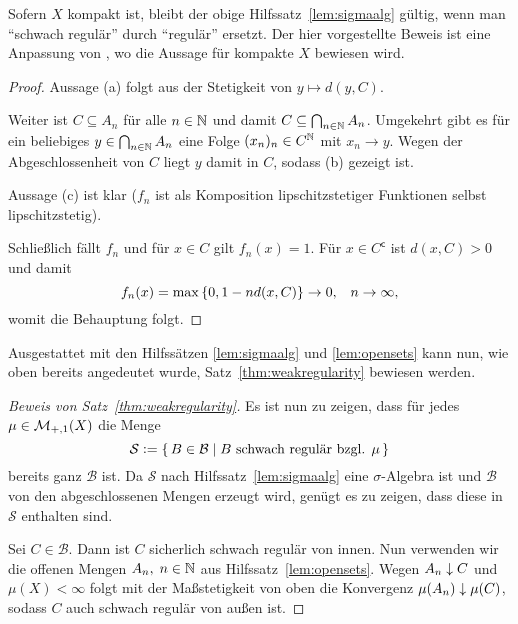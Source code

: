 \documentclass[../main/main.tex]{subfiles}
\begin{document}
	\begin{Bemerkung}
		Sofern $X$ kompakt ist, bleibt der obige Hilfssatz~\ref{lem:sigmaalg} 
		gültig, wenn man \enquote{schwach regulär} durch \enquote{regulär} 
		ersetzt. Der hier vorgestellte Beweis ist eine Anpassung von 
		\cite[Lemma 4.5.5]{Simon.2015}, wo die Aussage für kompakte $X$ bewiesen wird.
	\end{Bemerkung}

	\begin{proof}
		Aussage (a) folgt aus der Stetigkeit von $y \mapsto d(y, C)$.
		
		Weiter ist $C \subseteq A_n$ für alle $n \in \mathbb{N}$ und damit 
		$C \subseteq \bigcap_{n \in \mathbb{N}} A_n$. 
		Umgekehrt gibt es für ein beliebiges $y \in \bigcap_{n \in \mathbb{N}} A_n$
		eine Folge $(x_n)_n \in C^{\mathbb{N}}$ mit $x_n \rightarrow y$. 
		Wegen der Abgeschlossenheit von $C$ liegt $y$ damit in $C$, sodass (b) gezeigt ist.
		
		Aussage (c) ist klar ($f_n$ ist als Komposition 
		lipschitzstetiger Funktionen selbst lipschitzstetig).
		
		Schließlich fällt $f_n$ und für $x \in C$ gilt $f_n(x) = 1$. 
		Für $x \in C^\mathsf{c}$ ist $d(x, C) > 0$ und damit
		$$f_n(x) = \max \left\{0, 1-n d(x, C)\right\} 
			\to 0 \text{,} \quad n \to \infty \text{,}$$
		womit die Behauptung folgt.
	\end{proof}

	Ausgestattet mit den Hilfssätzen \ref{lem:sigmaalg} und \ref{lem:opensets} kann nun, 
	wie oben bereits angedeutet wurde, Satz~\ref{thm:weakregularity} bewiesen werden.

	\begin{proof}[Beweis von Satz~\ref{thm:weakregularity}]
		Es ist nun zu zeigen, dass für jedes $\mu \in \mathcal{M}_{+,1}(X)$
		die Menge 
		$$\mathcal{S} \vcentcolon = \left\{\, B \in \mathcal{B} \; \middle| \; B \text{ schwach regulär bzgl. } \mu \,\right\}$$
		bereits ganz $\mathcal{B}$ ist. 
		Da $\mathcal{S}$ nach Hilfssatz~\ref{lem:sigmaalg} eine 
		$\sigma$-Algebra ist und 
		$\mathcal{B}$ von den abgeschlossenen Mengen erzeugt wird, genügt es zu zeigen, 
		dass diese in $\mathcal{S}$ enthalten sind. 
		
		Sei $C \in \mathcal{B}$. Dann ist $C$ sicherlich schwach regulär von innen. 
		Nun verwenden wir die offenen Mengen $A_n, \; n \in \mathbb{N}$ aus 
		Hilfssatz~\ref{lem:opensets}. 
		Wegen $A_n \downarrow C$ und $\mu(X) < \infty$ folgt mit der 
		Maßstetigkeit von oben die Konvergenz $\mu(A_n) \downarrow \mu(C)$,
		sodass $C$ auch schwach regulär von außen ist.
	\end{proof}
\end{document}
